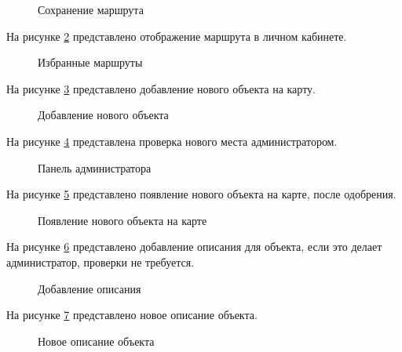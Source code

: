 \begin{figure}[H]
	\center{\texttt{[image: r12]}}
	\caption{Сохранение маршрута}
	\label{r12:image}
\end{figure}

\newpage
На рисунке \ref{r13:image} представлено отображение маршрута в личном кабинете.

\begin{figure}[H]
	\center{\texttt{[image: r13]}}
	\caption{Избранные маршруты}
	\label{r13:image}
\end{figure}

На рисунке \ref{r14:image} представлено добавление нового объекта на карту.

\begin{figure}[H]
	\center{\texttt{[image: r14]}}
	\caption{Добавление нового объекта}
	\label{r14:image}
\end{figure}

\newpage
На рисунке \ref{r15:image} представлена проверка нового места администратором.

\begin{figure}[H]
	\center{\texttt{[image: r15]}}
	\caption{Панель администратора}
	\label{r15:image}
\end{figure}

На рисунке \ref{r16:image} представлено появление нового объекта на карте, после одобрения.

\begin{figure}[H]
	\center{\texttt{[image: r16]}}
	\caption{Появление нового объекта на карте}
	\label{r16:image}
\end{figure}

\newpage
На рисунке \ref{r17:image} представлено добавление описания для объекта, если это делает администратор, проверки не требуется.

\begin{figure}[H]
	\center{\texttt{[image: r17]}}
	\caption{Добавление описания}
	\label{r17:image}
\end{figure}

На рисунке \ref{r18:image} представлено новое описание объекта.

\begin{figure}[H]
	\center{\texttt{[image: r18]}}
	\caption{Новое описание объекта}
	\label{r18:image}
\end{figure}

